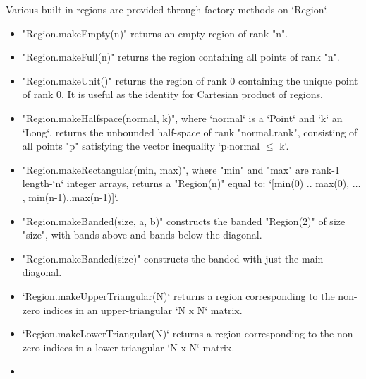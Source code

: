 Various built-in regions are provided through  factory
methods on \xcd`Region`.  
\begin{itemize}
\item \xcd"Region.makeEmpty(n)" returns an empty region of rank \xcd"n".
\item \xcd"Region.makeFull(n)" returns the region containing all points of
      rank \xcd"n".  
\item \xcd"Region.makeUnit()" returns the region of rank 0 containing the
      unique point of rank 0.  It is useful as the identity for Cartesian
      product of regions.
\item \xcd"Region.makeHalfspace(normal, k)",
      where \xcd`normal` is a \xcd`Point` and \xcd`k` an \xcd`Long`, 
      returns the unbounded
      half-space of rank \xcd"normal.rank", consisting of all points \xcd"p"
      satisfying the vector inequality \xcdmath`p$\cdot$normal $\le$ k`.
\item \xcd"Region.makeRectangular(min, max)", 
      where \xcd"min" and \xcd"max"
      are rank-1 length-\xcd`n` integer arrays, returns a
      \xcd"Region(n)" equal to: 
      \xcdmath`[min(0) .. max(0), $\ldots$, min(n-1)..max(n-1)]`.
\item \xcd"Region.makeBanded(size, a, b)" constructs the
      banded \xcd"Region(2)" of size \xcd"size", with  bands above
      and  bands below the diagonal.
\item \xcd"Region.makeBanded(size)" constructs the banded  with
      just the main diagonal.
\item \xcd`Region.makeUpperTriangular(N)` returns a region corresponding
to the non-zero indices in an upper-triangular \xcd`N x N` matrix.
\item \xcd`Region.makeLowerTriangular(N)` returns a region corresponding
to the non-zero indices in a lower-triangular \xcd`N x N` matrix.
\item 

\end{itemize}
